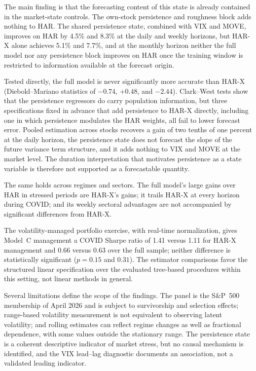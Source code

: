 \documentclass[jrfm,article,submit,moreauthors,pdftex]{Definitions/mdpi}
\begin{document}
The main finding is that the forecasting content of this state is already
contained in the market-state controls. The own-stock persistence and
roughness block adds nothing to HAR. The shared persistence state,
combined with VIX and MOVE, improves on HAR by 4.5\% and 8.3\% at the
daily and weekly horizons, but HAR-X alone achieves 5.1\% and 7.7\%, and
at the monthly horizon neither the full model nor any persistence block
improves on HAR once the training window is restricted to information
available at the forecast origin.

Tested directly, the full model is never significantly more accurate than
HAR-X (Diebold--Mariano statistics of $-0.74$, $+0.48$, and $-2.44$).
Clark--West tests show that the persistence regressors do carry
population information, but three specifications fixed in advance that add
persistence to HAR-X directly, including one in which persistence
modulates the HAR weights, all fail to lower forecast error. Pooled
estimation across stocks recovers a gain of two tenths of one percent at
the daily horizon, the persistence state does not forecast the slope of the
future variance term structure, and it adds nothing to VIX and MOVE at
the market level. The duration interpretation that motivates persistence
as a state variable is therefore not supported as a forecastable quantity.

The same holds across regimes and sectors. The full model's large gains
over HAR in stressed periods are HAR-X's gains; it trails HAR-X at every
horizon during COVID; and its weekly sectoral advantages are not
accompanied by significant differences from HAR-X.

The volatility-managed portfolio exercise, with real-time normalization,
gives Model~C management a COVID Sharpe ratio of 1.41 versus 1.11 for
HAR-X management and 0.66 versus 0.63 over the full sample; neither
difference is statistically significant ($p = 0.15$ and $0.31$). The
estimator comparisons favor the structured linear specification over the
evaluated tree-based procedures within this setting, not linear methods in
general.

Several limitations define the scope of the findings. The panel is the
S\&P~500 membership of April 2026 and is subject to survivorship and
selection effects; range-based volatility measurement is not equivalent to
observing latent volatility; and rolling estimates can reflect regime
changes as well as fractional dependence, with some values outside the
stationary range. The persistence state is a coherent descriptive indicator
of market stress, but no causal mechanism is identified, and the VIX
lead--lag diagnostic documents an association, not a validated leading
indicator.
\end{document}
